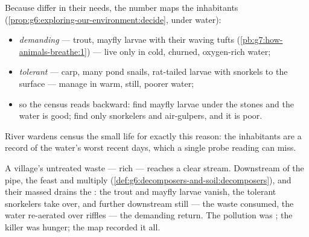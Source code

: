 \begin{proposition}\label{prop:g7:oxygen-in-the-water:map}
Because  differ in their  needs, the 
number maps the inhabitants
(\cref{prop:g6:exploring-our-environment:decide}, under
water):
\begin{itemize}
  \item \emph{demanding}  --- trout, mayfly larvae
        with their waving  tufts
        (\cref{pb:g7:how-animals-breathe:1}) --- live only
        in cold, churned, oxygen-rich water;
  \item \emph{tolerant}  --- carp, many pond snails,
        rat-tailed larvae with snorkels to the surface ---
        manage in warm, still, poorer water;
  \item so the census reads backward: find mayfly larvae
        under the stones and the water is good; find only
        snorkelers and air-gulpers, and it is poor.
\end{itemize}
River wardens census the small life for exactly this
reason: the inhabitants are a record of the water's worst
recent days, which a single probe reading can miss.
\end{proposition}
\admitted

\begin{example}\label{ex:g7:oxygen-in-the-water:waste}
A village's untreated waste --- rich  ---
reaches a clear stream. Downstream of the pipe, the
 feast and multiply
(\cref{def:g6:decomposers-and-soil:decomposers}), and their
massed  drains the : the trout and mayfly
larvae vanish, the tolerant snorkelers take over, and
further downstream still --- the waste consumed, the water
re-aerated over riffles --- the demanding  return.
The pollution was ; the killer was 
hunger; the map recorded it all.
\end{example}

